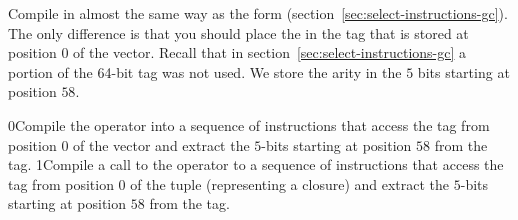\documentclass[7x10]{TimesAPriori_MIT}%
\def\racketEd{0}
\def\pythonEd{1}
\def\edition{0}
\newcommand{\racket}[1]{{\if\edition\racketEd{#1}\fi}}
\newcommand{\python}[1]{{\if\edition\pythonEd #1\fi}}
\numberwithin{theorem}{chapter}
\numberwithin{definition}{chapter}
\numberwithin{equation}{chapter}
\begin{document}
Compile  in almost the
same way as the  form
(section~\ref{sec:select-instructions-gc}). The only difference is
that you should place the  in the tag that is stored at
position $0$ of the vector. Recall that in
section~\ref{sec:select-instructions-gc} a portion of the 64-bit tag
was not used. We store the arity in the $5$ bits starting at position
$58$.

\racket{Compile the  operator into a sequence of
instructions that access the tag from position $0$ of the vector and
extract the $5$-bits starting at position $58$ from the tag.}
%
\python{Compile a call to the  operator to a sequence of
instructions that access the tag from position $0$ of the tuple
(representing a closure) and extract the $5$-bits starting at position
$58$ from the tag.}
\end{document}
